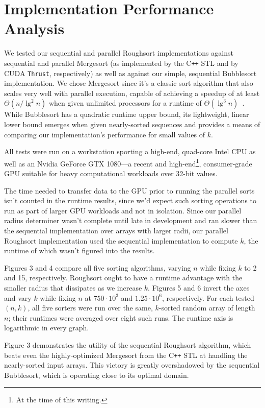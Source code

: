 \documentclass[letterpaper, 12pt]{article}
\let\supercite\cite
\renewcommand{\cite}[1]{\textnormal{~\supercite{#1}}}
\begin{document}
\section{Implementation Performance Analysis}
We tested our sequential and parallel Roughsort implementations against sequential and parallel Mergesort (as implemented by
  the C\texttt{++} STL and by CUDA \texttt{Thrust}, respectively) as well as against our simple, sequential Bubblesort implementation.
We chose Mergesort since it's a classic sort algorithm that also scales very well with parallel execution, capable
  of achieving a speedup of at least $\Theta(n / \lg^2 n)$ when given unlimited processors for a runtime of
  $\Theta(\lg^3 n)$\cite{clrs}.
While Bubblesort has a quadratic runtime upper bound, its lightweight, linear lower bound emerges when given nearly-sorted
  sequences and provides a means of comparing our implementation's performance for small values of $k$.

All tests were run on a workstation sporting a high-end, quad-core Intel CPU as well as an Nvidia GeForce GTX 1080---a
  recent and high-end\footnote{At the time of this writing.}, consumer-grade GPU suitable for heavy computational workloads
  over 32-bit values.

The time needed to transfer data to the GPU prior to running the parallel sorts isn't counted in the runtime results, since we'd
  expect such sorting operations to run as part of larger GPU workloads and not in isolation.
Since our parallel radius determiner wasn't complete until late in development and ran slower than the sequential
  implementation over arrays with larger radii, our parallel Roughsort implementation used the sequential implementation to
  compute $k$, the runtime of which wasn't figured into the results.

Figures 3 and 4 compare all five sorting algorithms, varying $n$ while fixing $k$ to 2 and 15, respectively. Roughsort ought
  to have a runtime advantage with the smaller radius that dissipates as we increase $k$.
Figures 5 and 6 invert the axes and vary $k$ while fixing $n$ at $750 \cdot 10^3$ and $1.25 \cdot 10^6$, respectively. 
For each tested $(n, k)$, all five sorters were run over the same, $k$-sorted random array of length $n$; their runtimes were
  averaged over eight such runs.
The runtime axis is logarithmic in every graph.

Figure 3 demonstrates the utility of the sequential Roughsort algorithm, which beats even the highly-optimized Mergesort from
  the C\texttt{++} STL at handling the nearly-sorted input arrays.
This victory is greatly overshadowed by the sequential Bubblesort, which is operating close to its optimal domain.
\end{document}

